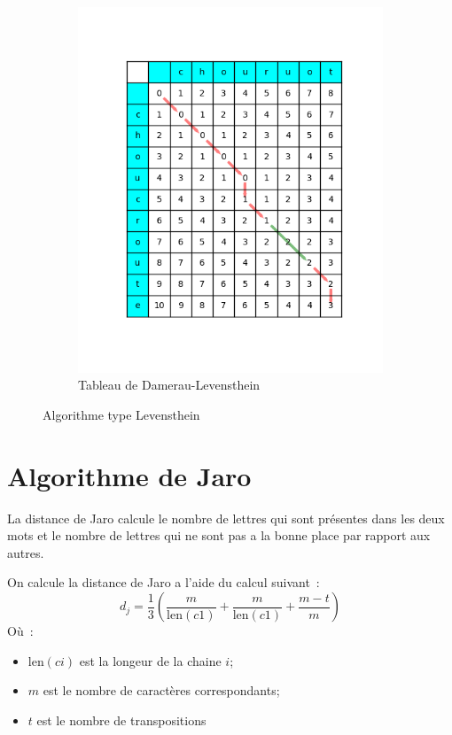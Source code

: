 \documentclass[final, 10pt]{report}
\begin{document}
\begin{figure}
\begin{subfigure}{0.4\textwidth}
            \includegraphics[height=0.4\textheight]{img/Tableau_de_Damerau-Levenshtein.png}
            \caption{Tableau de Damerau-Levensthein}
            \label{fig:tab_damerau}
        \end{subfigure}
        \caption{Algorithme type Levensthein}
        \label{fig:algo_levensthein}
    \end{figure}
    
\section{Algorithme de Jaro\cite{noauthor_distance_2021}}
    
    La distance de Jaro calcule le nombre de lettres qui sont présentes dans les deux mots et le nombre de lettres qui ne sont pas a la bonne place par rapport aux autres.
    
    
    On calcule la distance de Jaro a l'aide du calcul suivant~: 
    $$d_j = \frac{1}{3}\left(\frac{m}{\text{len}(c1)}+\frac{m}{\text{len}(c1)}+\frac{m-t}{m}\right)$$
    Où~:
    \begin{itemize}
        \item $\text{len}(ci)$ est la longeur de la chaine $i$;
        \item $m$ est le nombre de caractères correspondants;
        \item $t$ est le nombre de transpositions
    \end{itemize}
\end{document}
